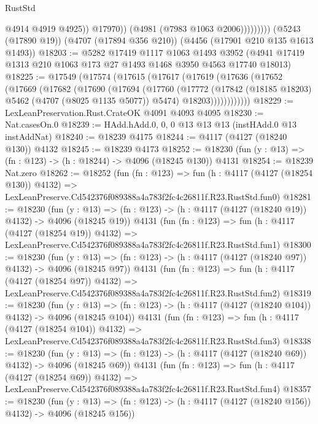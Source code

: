 \begin{lexlean}{RustStd}
\begin{coremodule}
                          @4914
                          @4919
                          @4925))
                      @17970))
                  (@4981 (@7983 @1063 @2006)))))))))
    (@5243 (@17890 @19))
    (@4707 (@17894 @356 @210))
    (@4456 (@17901 @210 @135 @1613 @1493))
@18203 := @5282
    @17419
    @1117
    @1063
    @1493
    @3952
    (@4941 @17419 @1313 @210 @1063 @173 @27 @1493 @1468 @3950 @4563 @17740 @18013)
@18225 := @17549
    (@17574
      (@17615
        (@17617
          (@17619
            (@17636
              (@17652
                (@17669
                  (@17682
                    (@17690
                      (@17694
                        (@17760
                          (@17772
                            (@17842 (@18185 @18203) @5462 (@4707 (@8025 @1135 @5077)) @5474)
                            @18203))))))))))))
@18229 := LexLeanPreservation.Rust.CrateOK @4091 @4093 @4095
@18230 := Nat.casesOn.{0}
@18239 := HAdd.hAdd.{0, 0, 0} @13 @13 @13 (instHAdd.{0} @13 instAddNat)
@18240 := @18239 @4175
@18244 := @4117 (@4127 (@18240 @130)) @4132
@18245 := @18239 @4173
@18252 := @18230 (fun (y : @13) => (fn : @123) -> (h : @18244) -> @4096 (@18245 @130)) @4131
@18254 := @18239 Nat.zero
@18262 := @18252
    (fun (fn : @123) =>
    fun (h : @4117 (@4127 (@18254 @130)) @4132) =>
    LexLeanPreserve.Cd542376f089388a4a783f2fc4c26811f.R23.RustStd.fun0)
@18281 := @18230
    (fun (y : @13) => (fn : @123) -> (h : @4117 (@4127 (@18240 @19)) @4132) -> @4096 (@18245 @19))
    @4131
    (fun (fn : @123) =>
    fun (h : @4117 (@4127 (@18254 @19)) @4132) =>
    LexLeanPreserve.Cd542376f089388a4a783f2fc4c26811f.R23.RustStd.fun1)
@18300 := @18230
    (fun (y : @13) => (fn : @123) -> (h : @4117 (@4127 (@18240 @97)) @4132) -> @4096 (@18245 @97))
    @4131
    (fun (fn : @123) =>
    fun (h : @4117 (@4127 (@18254 @97)) @4132) =>
    LexLeanPreserve.Cd542376f089388a4a783f2fc4c26811f.R23.RustStd.fun2)
@18319 := @18230
    (fun (y : @13) => (fn : @123) -> (h : @4117 (@4127 (@18240 @104)) @4132) -> @4096 (@18245 @104))
    @4131
    (fun (fn : @123) =>
    fun (h : @4117 (@4127 (@18254 @104)) @4132) =>
    LexLeanPreserve.Cd542376f089388a4a783f2fc4c26811f.R23.RustStd.fun3)
@18338 := @18230
    (fun (y : @13) => (fn : @123) -> (h : @4117 (@4127 (@18240 @69)) @4132) -> @4096 (@18245 @69))
    @4131
    (fun (fn : @123) =>
    fun (h : @4117 (@4127 (@18254 @69)) @4132) =>
    LexLeanPreserve.Cd542376f089388a4a783f2fc4c26811f.R23.RustStd.fun4)
@18357 := @18230
    (fun (y : @13) => (fn : @123) -> (h : @4117 (@4127 (@18240 @156)) @4132) -> @4096 (@18245 @156))

\end{coremodule}
\end{lexlean}
